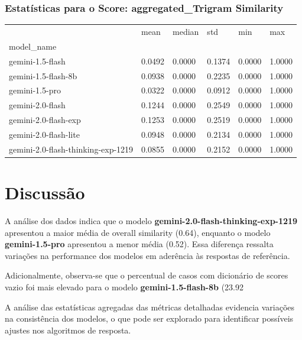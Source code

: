 \documentclass{article}%
\begin{document}
\subsubsection*{Estatísticas para o Score: aggregated\_Trigram Similarity}%
\begin{table}[H]%
\centering%
\begin{tabular}{llllll}
\toprule
 & mean & median & std & min & max \\
model_name &  &  &  &  &  \\
\midrule
gemini-1.5-flash & 0.0492 & 0.0000 & 0.1374 & 0.0000 & 1.0000 \\
gemini-1.5-flash-8b & 0.0938 & 0.0000 & 0.2235 & 0.0000 & 1.0000 \\
gemini-1.5-pro & 0.0322 & 0.0000 & 0.0912 & 0.0000 & 1.0000 \\
gemini-2.0-flash & 0.1244 & 0.0000 & 0.2549 & 0.0000 & 1.0000 \\
gemini-2.0-flash-exp & 0.1253 & 0.0000 & 0.2519 & 0.0000 & 1.0000 \\
gemini-2.0-flash-lite & 0.0948 & 0.0000 & 0.2134 & 0.0000 & 1.0000 \\
gemini-2.0-flash-thinking-exp-1219 & 0.0855 & 0.0000 & 0.2152 & 0.0000 & 1.0000 \\
\bottomrule
\end{tabular}
%
\end{table}%
\vspace{0.5cm}

%
\section*{Discussão}%
\label{sec:Discusso}%

A análise dos dados indica que o modelo \textbf{gemini-2.0-flash-thinking-exp-1219} apresentou a maior média de overall similarity (0.64), 
enquanto o modelo \textbf{gemini-1.5-pro} apresentou a menor média (0.52). Essa diferença ressalta variações na performance 
dos modelos em aderência às respostas de referência.

Adicionalmente, observa-se que o percentual de casos com dicionário de scores vazio foi mais elevado para o modelo 
\textbf{gemini-1.5-flash-8b} (23.92%

A análise das estatísticas agregadas das métricas detalhadas evidencia variações na consistência dos modelos, o que pode ser explorado 
para identificar possíveis ajustes nos algoritmos de resposta.
\end{document}
